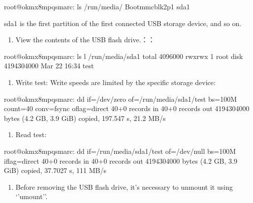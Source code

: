 \documentclass[letterpaper,10pt,openany,english]{sphinxmanual}
\begin{document}
\begin{sphinxVerbatim}[commandchars=\\\{\}]
root@ok\PYGZhy{}mx8mpq\PYGZhy{}smarc:\PYGZti{}\PYGZsh{} ls /run/media/
Boot\PYGZhy{}mmcblk2p1  sda1
\end{sphinxVerbatim}

\sphinxAtStartPar
sda1 is the first partition of the first connected USB storage device, and so on.
\begin{enumerate}
%
\setcounter{enumi}{2}
\item {} 
\sphinxAtStartPar
View the contents of the USB flash drive.：：

\end{enumerate}

\begin{sphinxVerbatim}[commandchars=\\\{\}]
root@ok\PYGZhy{}mx8mpq\PYGZhy{}smarc:\PYGZti{}\PYGZsh{} ls \PYGZhy{}l /run/media/sda1
total 4096000
\PYGZhy{}rwxrwx\PYGZhy{}\PYGZhy{}\PYGZhy{} 1 root disk 4194304000 Mar 22 16:34 test
\end{sphinxVerbatim}
\begin{enumerate}
%
\setcounter{enumi}{3}
\item {} 
\sphinxAtStartPar
Write test: Write speeds are limited by the specific storage device:

\end{enumerate}

\begin{sphinxVerbatim}[commandchars=\\\{\}]
root@ok\PYGZhy{}mx8mpq\PYGZhy{}smarc:\PYGZti{}\PYGZsh{} dd if=/dev/zero of=/run/media/sda1/test bs=100M count=40 \PYGZbs{}
conv=fsync oflag=direct
40+0 records in
40+0 records out
4194304000 bytes (4.2 GB, 3.9 GiB) copied, 197.547 s, 21.2 MB/s
\end{sphinxVerbatim}
\begin{enumerate}
%
\setcounter{enumi}{4}
\item {} 
\sphinxAtStartPar
Read test:

\end{enumerate}

\sphinxAtStartPar
{}

\begin{sphinxVerbatim}[commandchars=\\\{\}]
root@ok\PYGZhy{}mx8mpq\PYGZhy{}smarc:\PYGZti{}\PYGZsh{} dd if=/run/media/sda1/test of=/dev/null bs=100M iflag=direct
40+0 records in
40+0 records out
4194304000 bytes (4.2 GB, 3.9 GiB) copied, 37.7027 s, 111 MB/s
\end{sphinxVerbatim}
\begin{enumerate}
%
\setcounter{enumi}{5}
\item {} 
\sphinxAtStartPar
Before removing the USB flash drive, it’s necessary to unmount it using ‘’umount’’.

\end{enumerate}
\end{document}
